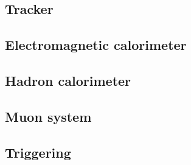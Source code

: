 \subsection{Tracker}
\subsection{Electromagnetic calorimeter}
\subsection{Hadron calorimeter}
\subsection{Muon system}
\subsection{Triggering}

